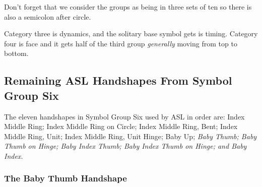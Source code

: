 \documentclass{article}
\begin{document}
Don't forget that we consider the groups as being in three sets of ten so there is also a semicolon after circle.

Category three is dynamics, and the solitary base symbol gets is timing.
Category four is face and it gets half of the third group \emph{generally} moving from top to bottom.

\subsection{Remaining ASL Handshapes From Symbol Group Six}

The eleven handshapes in Symbol Group Six used by ASL in order are:
Index Middle Ring;
Index Middle Ring on Circle;
Index Middle Ring, Bent;
Index Middle Ring, Unit;
Index Middle Ring, Unit Hinge;
Baby Up;
{\it
Baby Thumb;
Baby Thumb on Hinge;
Baby Index Thumb;
Baby Index Thumb on Hinge;
and Baby Index.
}

\subsubsection{The Baby Thumb Handshape}
\end{document}
